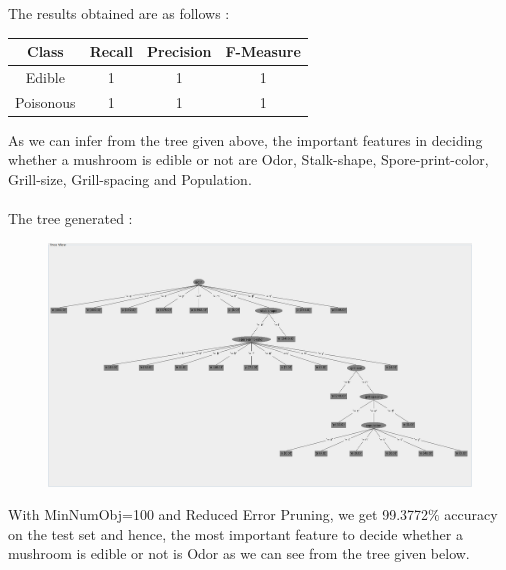 \documentclass[paper=a4, fontsize=11pt]{scrartcl}
\numberwithin{equation}{section}		%
\numberwithin{figure}{section}			%
\numberwithin{table}{section}				%
\begin{document}
The results obtained are as follows :\\
\begin{table}[H]
\label{T:equipos}
\begin{center}
\begin{tabular}{| c | c | c | c |}
\hline
\textbf{Class} & \textbf{Recall} & \textbf{Precision} & \textbf{F-Measure}\\ 
\hline

Edible & 1  & 1 & 1 \\ \hline
Poisonous & 1 & 1 & 1 \\ \hline

\end{tabular}
\end{center}
\end{table}
As we can infer from the tree given above, the important features in deciding whether a mushroom is edible or not are \textcolor{OliveGreen}{Odor}, \textcolor{OliveGreen}{Stalk-shape}, \textcolor{OliveGreen}{Spore-print-color}, \textcolor{OliveGreen}{Grill-size}, \textcolor{OliveGreen}{Grill-spacing} and \textcolor{OliveGreen}{Population}.\\\\
The tree generated :\\

\begin{figure}[H]
\begin{center}
\graphicspath{ {../EE15B025_PA2/Code/q5/Trees/} }
\includegraphics[scale=0.25]{cross_valid_2}
\end{center}
\end{figure}

With MinNumObj=100 and Reduced Error Pruning, we get 99.3772$\%$ accuracy on the test set and hence, the most important feature to decide whether a mushroom is edible or not is \textcolor{OliveGreen}{Odor} as we can see from the tree given below.
\end{document}
